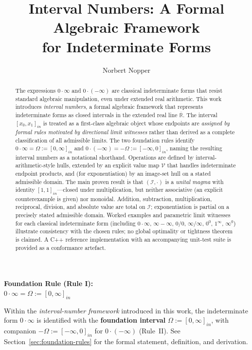 \documentclass[11pt,a4paper]{article}
\title{Interval Numbers: A Formal Algebraic Framework\\
for Indeterminate Forms}
\author{Norbert Nopper}
\date{}
\theoremstyle{paperdef}
\newcommand{\Rext}{\overline{\mathbb{R}}}
\newcommand{\Iset}{\mathcal{I}}
\newcommand{\inI}[1]{[#1]_{in}}
\newcommand{\V}{\mathcal{V}}
\begin{document}
\maketitle

\begin{center}
\textbf{Foundation Rule (Rule I):}\\[0.5em]
$0 \cdot \infty = \Omega := \inI{0, \infty}$
\end{center}

\noindent
Within the \emph{interval-number framework} introduced in this work, the
indeterminate form $0 \cdot \infty$ is identified with the
\textbf{foundation interval} $\Omega := \inI{0, \infty}$, with companion
$-\Omega := \inI{-\infty, 0}$ for $0 \cdot (-\infty)$ (Rule~II).
See Section~\ref{sec:foundation-rules} for the formal statement,
definition, and derivation.

\begin{abstract}
The expressions $0 \cdot \infty$ and $0 \cdot (-\infty)$ are classical
indeterminate forms that resist standard algebraic manipulation, even
under extended real arithmetic. This work introduces \emph{interval
numbers}, a formal algebraic framework that represents indeterminate
forms as closed intervals in the extended real line $\Rext$. The
interval $\inI{x_0, x_1}$ is treated as a first-class algebraic object
whose endpoints are \emph{assigned by formal rules motivated by
directional limit witnesses} rather than derived as a complete
classification of all admissible limits. The two foundation rules
identify $0 \cdot \infty = \Omega := \inI{0, \infty}$ and
$0 \cdot (-\infty) = -\Omega := \inI{-\infty, 0}$, naming the resulting
interval numbers as a notational shorthand. Operations are defined by
interval-arithmetic-style hulls, extended by an explicit value map
$\V$ that handles indeterminate endpoint products, and (for
exponentiation) by an image-set hull on a stated admissible domain.
The main proven result is that $(\Iset, \cdot)$ is a \emph{unital
magma} with identity $\inI{1,1}$---closed under multiplication, but
neither associative (an explicit counterexample is given) nor
monoidal. Addition, subtraction, multiplication, reciprocal, division,
and absolute value are total on $\Iset$; exponentiation is partial on a
precisely stated admissible domain. Worked examples and parametric
limit witnesses for each classical indeterminate form (including
$0\cdot\infty$, $\infty-\infty$, $0/0$, $\infty/\infty$, $0^0$,
$1^\infty$, $\infty^0$) illustrate consistency with the chosen rules;
no global optimality or tightness theorem is claimed. A C++ reference
implementation with an accompanying unit-test suite is provided as a
conformance artefact.
\end{abstract}
\end{document}
